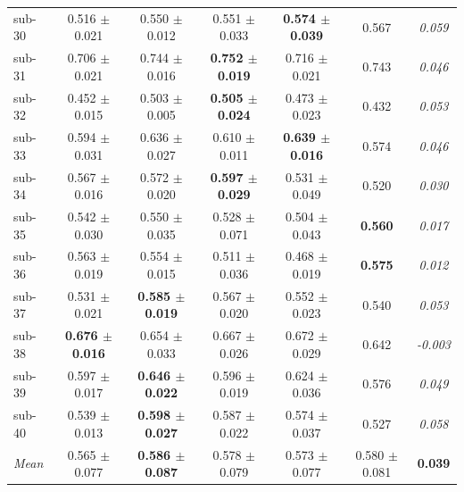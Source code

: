\begin{table}[t]
\begin{tabular}{lcccccc}
sub-30 & 0.516 $\pm$ 0.021 & 0.550 $\pm$ 0.012 & 0.551 $\pm$ 0.033 & \textbf{0.574 $\pm$ 0.039} & 0.567 & \textit{0.059} \\
sub-31 & 0.706 $\pm$ 0.021 & 0.744 $\pm$ 0.016 & \textbf{0.752 $\pm$ 0.019} & 0.716 $\pm$ 0.021 & 0.743 & \textit{0.046} \\
sub-32 & 0.452 $\pm$ 0.015 & 0.503 $\pm$ 0.005 & \textbf{0.505 $\pm$ 0.024} & 0.473 $\pm$ 0.023 & 0.432 & \textit{0.053} \\
sub-33 & 0.594 $\pm$ 0.031 & 0.636 $\pm$ 0.027 & 0.610 $\pm$ 0.011 & \textbf{0.639 $\pm$ 0.016} & 0.574 & \textit{0.046} \\
sub-34 & 0.567 $\pm$ 0.016 & 0.572 $\pm$ 0.020 & \textbf{0.597 $\pm$ 0.029} & 0.531 $\pm$ 0.049 & 0.520 & \textit{0.030} \\
sub-35 & 0.542 $\pm$ 0.030 & 0.550 $\pm$ 0.035 & 0.528 $\pm$ 0.071 & 0.504 $\pm$ 0.043 & \textbf{0.560} & \textit{0.017} \\
sub-36 & 0.563 $\pm$ 0.019 & 0.554 $\pm$ 0.015 & 0.511 $\pm$ 0.036 & 0.468 $\pm$ 0.019 & \textbf{0.575} & \textit{0.012} \\
sub-37 & 0.531 $\pm$ 0.021 & \textbf{0.585 $\pm$ 0.019} & 0.567 $\pm$ 0.020 & 0.552 $\pm$ 0.023 & 0.540 & \textit{0.053} \\
sub-38 & \textbf{0.676 $\pm$ 0.016} & 0.654 $\pm$ 0.033 & 0.667 $\pm$ 0.026 & 0.672 $\pm$ 0.029 & 0.642 & \textit{-0.003} \\
sub-39 & 0.597 $\pm$ 0.017 & \textbf{0.646 $\pm$ 0.022} & 0.596 $\pm$ 0.019 & 0.624 $\pm$ 0.036 & 0.576 & \textit{0.049} \\
sub-40 & 0.539 $\pm$ 0.013 & \textbf{0.598 $\pm$ 0.027} & 0.587 $\pm$ 0.022 & 0.574 $\pm$ 0.037 & 0.527 & \textit{0.058} \\
\midrule
\textit{Mean} & 0.565 $\pm$ 0.077 & \textbf{0.586 $\pm$ 0.087} & 0.578 $\pm$ 0.079 & 0.573 $\pm$ 0.077 & 0.580 $\pm$ 0.081 & \textbf{0.039} \\
\bottomrule
\end{tabular}
\end{table}
